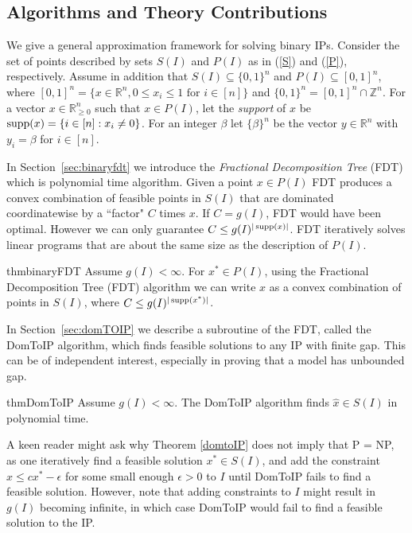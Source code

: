 \subsection{Algorithms and Theory Contributions} 
 
We give a general approximation framework for solving binary IPs.
Consider the set of points described by sets $S(I)$ and $P(I)$ as in (\ref{S}) and (\ref{P}), respectively. Assume in addition that $S(I)\subseteq  \{0,1\}^n$ and $P(I)\subseteq [0,1]^n$, where $[0,1]^n = \{x\in \mathbb{R}^n, 0\leq x_i\leq 1 \mbox{ for } i\in[n]\}$ and $\{0,1\}^n = [0,1]^n \cap \mathbb{Z}^n$.
For a vector $x\in \mathbb{R}_{\geq 0}^n$ such that $x\in P(I)$, let the {\em support} of $x$ be $\operatorname{supp}(x)= \{i \in [n]: x_i \neq 0\}$. For an integer $\beta$ let $\{\beta\}^n$ be the vector $y\in \mathbb{R}^n$ with $y_i=\beta$ for $i\in [n]$.


In Section~\ref{sec:binaryfdt} we introduce the \textit{Fractional Decomposition Tree} (FDT) which is polynomial time algorithm. Given a point $x\in P(I)$ FDT produces a convex combination of feasible points in $S(I)$ that are dominated coordinatewise by a ``factor" $C$ times $x$.
If $C = g(I)$, FDT would have been optimal. However we can only guarantee $C\leq g(I)^{|\operatorname{supp}(x)|}$. FDT iteratively solves linear programs that are about the same size as the description of $P(I)$.

\begin{restatable}{thm}{binaryFDT}
	\label{binaryFDT}
	Assume $g(I) 	<\infty$. For $x^*\in P(I)$, using 	the Fractional Decomposition Tree (FDT) algorithm we can write $x$ as a convex combination of points in $S(I)$, where $C\leq g(I)^{|\operatorname{supp}(x^*)|}$.
\end{restatable}

In Section~\ref{sec:domTOIP} we describe a subroutine of the FDT, called the DomToIP algorithm, which finds feasible solutions to any IP with finite gap. This can be of independent interest, especially in proving that a model has unbounded gap.
\begin{restatable}{thm}{DomToIP}
	\label{domtoIP}
	Assume $g(I) < \infty$. The DomToIP algorithm finds $\hat{x}\in S(I)$ in polynomial time.
\end{restatable}

A keen reader might ask why Theorem \ref{domtoIP} does not imply that P = NP, as one iteratively find a feasible solution $x^*\in S(I)$, and add the constraint $x\leq cx^*-\epsilon$ for some small enough $\epsilon>0$ to $I$ until DomToIP fails to find a feasible solution. However, note that adding constraints to $I$ might result in $g(I)$ becoming infinite, in which case DomToIP would fail to find a feasible solution to the IP. 

